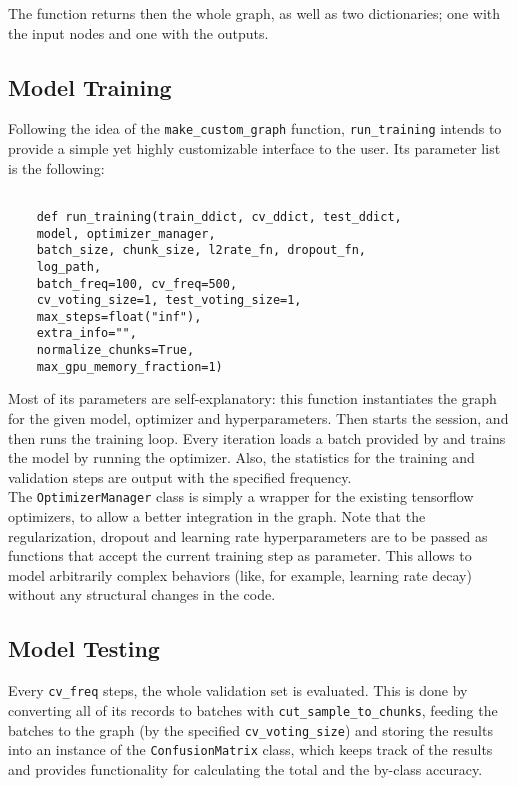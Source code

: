   The function returns then the whole graph, as well as two dictionaries; one with the input nodes and one with the outputs.

  \subsection{Model Training}

  Following the idea of the  \texttt{make\_custom\_graph} function,  \texttt{run\_training} intends to provide a simple yet highly customizable interface to the user. Its parameter list is the following:

  \lstset{language=Python}
  \lstset{basicstyle=\footnotesize}
  \begin{lstlisting}

    def run_training(train_ddict, cv_ddict, test_ddict,
    model, optimizer_manager,
    batch_size, chunk_size, l2rate_fn, dropout_fn,
    log_path,
    batch_freq=100, cv_freq=500,
    cv_voting_size=1, test_voting_size=1,
    max_steps=float("inf"),
    extra_info="",
    normalize_chunks=True,
    max_gpu_memory_fraction=1)
  \end{lstlisting}

  Most of its parameters are self-explanatory: this function instantiates the graph for the given model, optimizer and hyperparameters. Then starts the session, and then runs the training loop. Every iteration loads a batch provided by  and trains the model by running the optimizer. Also, the statistics for the training and validation steps are output with the specified frequency.\\

  The \texttt{OptimizerManager} class is simply a wrapper for the existing tensorflow optimizers, to allow a better integration in the graph. Note that the regularization, dropout and learning rate hyperparameters are to be passed as functions that accept the current training step as parameter. This allows to model arbitrarily complex behaviors (like, for example, learning rate decay) without any structural changes in the code.

  \subsection{Model Testing}

  Every \texttt{cv\_freq} steps, the whole validation set is evaluated. This is done by converting all of its records to batches with \texttt{cut\_sample\_to\_chunks}, feeding the batches to the graph (by the specified \texttt{cv\_voting\_size}) and storing the results into an instance of the \texttt{ConfusionMatrix} class, which keeps track of the results and provides functionality for calculating the total and the by-class accuracy.\\

